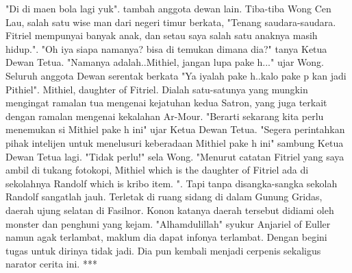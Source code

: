 \documentclass[a4paper,11pt,final]{article}
\begin{document}
"Di di maen bola lagi yuk". tambah anggota dewan lain. Tiba-tiba Wong Cen Lau, salah satu wise man dari negeri timur berkata, "Tenang saudara-saudara. Fitriel mempunyai banyak anak, dan setau saya salah satu anaknya masih hidup.".
"Oh iya siapa namanya? bisa di temukan dimana dia?" tanya Ketua Dewan Tetua. "Namanya adalah..Mithiel, jangan lupa pake h..." ujar Wong. Seluruh anggota Dewan serentak berkata "Ya iyalah pake h..kalo pake p kan jadi Pithiel".
Mithiel, daughter of Fitriel. Dialah satu-satunya yang mungkin mengingat ramalan tua mengenai kejatuhan kedua Satron, yang juga terkait dengan ramalan mengenai kekalahan Ar-Mour.
"Berarti sekarang kita perlu menemukan si Mithiel pake h ini" ujar Ketua Dewan Tetua. "Segera perintahkan pihak intelijen untuk menelusuri keberadaan Mithiel pake h ini" sambung Ketua Dewan Tetua lagi.
"Tidak perlu!" sela Wong. "Menurut catatan Fitriel yang saya ambil di tukang fotokopi, Mithiel which is the daughter of Fitriel ada di sekolahnya Randolf which is kribo item. ".
Tapi tanpa disangka-sangka sekolah Randolf sangatlah jauh. Terletak di ruang sidang di dalam Gunung Gridas, daerah ujung selatan di Fasilnor. Konon katanya daerah tersebut didiami oleh monster dan penghuni yang kejam.
"Alhamdulillah" syukur Anjariel of Euller namun agak terlambat, maklum dia dapat infonya terlambat. Dengan begini tugas untuk dirinya tidak jadi. Dia pun kembali menjadi cerpenis sekaligus narator cerita ini.
***
\end{document}
